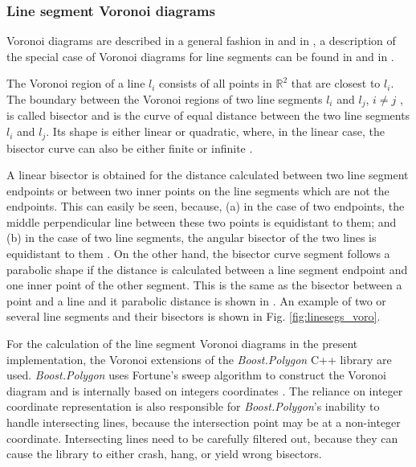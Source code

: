 \subsubsection*{Line segment Voronoi diagrams}
Voronoi diagrams are described in a general fashion in \cite[Ch. 7, pp. 147f]{Berg2008} and in
\cite[Ch. 5, pp. 209f]{Berg2008}, a description of the special case of Voronoi diagrams for line segments can be
found in \cite[Ch. 7.3, pp. 160-163]{Berg2008} and in \cite[pp. 242-247]{FUH_geo2020}.

The Voronoi region of a line $l_i$ consists of all points in $\mathbb{R}^2$ that are closest to $l_i$. 
The boundary between the Voronoi regions of two line segments $l_i$ and $l_j$, $i \neq j$ , 
is called bisector and is the curve of equal distance between the two line segments $l_i$ and $l_j$.
Its shape is either linear or quadratic, where, in the linear case, the bisector curve can also be either
finite or infinite \cite[pp. 243-244]{FUH_geo2020}.

A linear bisector is obtained for the distance calculated between two line segment endpoints or between two inner 
points on the line segments which are not the endpoints.
This can easily be seen, because, (a) in the case of two endpoints, the middle perpendicular line between these 
two points is equidistant to them; and (b) in the case of two line segments, the angular bisector of the two lines is
equidistant to them \cite[pp. 243-244]{FUH_geo2020}.
On the other hand, the bisector curve segment follows a parabolic shape if the distance is calculated 
between a line segment endpoint and one inner point of the other segment. This is the same as the bisector between
a point and a line and it parabolic distance is shown in \cite[pp. 260-261]{FUH_geo2020}.
An example of two or several line segments and their bisectors is shown in Fig. \ref{fig:linesegs_voro}.

For the calculation of the line segment Voronoi diagrams in the present implementation, the Voronoi extensions
\cite{web_boost_polygon_voronoi} of the \textit{Boost.Polygon} \cite{web_boost_polygon, Simonson2009} C++ library are used.
\textit{Boost.Polygon} uses Fortune's sweep algorithm \cite{Fortune1987} to construct the Voronoi diagram and is
internally based on integers coordinates \cite{web_boost_polygon}.
The reliance on integer coordinate representation is also responsible for \textit{Boost.Polygon}'s inability to handle
intersecting lines, because the intersection point may be at a non-integer coordinate. Intersecting lines need
to be carefully filtered out, because they can cause the library to either crash, hang, or yield wrong bisectors.

